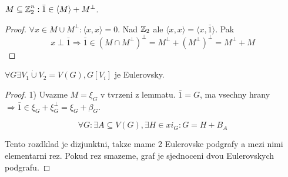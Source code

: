 \begin{lemma}
	$M \subseteq \operatorname{\mathbb{Z}}_2^n : \bar{1} \in \langle M \rangle + M^{\perp}$.
\end{lemma}
\begin{proof}
	$\forall x \in M \cup M^{\perp}: \langle x, x \rangle = 0$. Nad $\operatorname{\mathbb{Z}}_2$ ale $\langle x, x \rangle = \langle x, \bar{1} \rangle$. Pak
	\[ x \perp \bar{1} \Rightarrow \bar{1} \in (M \cap M^{\perp})^{\perp} = M^{\perp} + (M^{\perp})^{\perp} = M^{\perp} + M \]
\end{proof}

\begin{theorem}
	$\forall G \exists V_1 \mathbin{\dot{\cup}} V_2 = V(G), G[V_i]$ je Eulerovsky.
\end{theorem}
\begin{proof}
	1) Uvazme $M = \xi_G$ v tvrzeni z lemmatu. $\bar{1} = G$, ma vsechny hrany $\Rightarrow \bar{1} \in \xi_G + \xi_G^{\perp} = \xi_G + \beta_G$.

	\[ \forall G: \exists A \subseteq V(G), \exists H\in xi_G: G = H + B_A \]

	Tento rozdklad je dizjunktni, takze mame 2 Eulerovske podgrafy a mezi nimi elementarni rez. Pokud rez smazeme, graf je sjednoceni dvou Eulerovskych podgrafu.

\end{proof}
